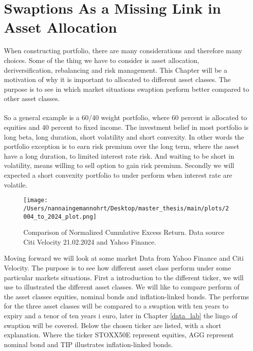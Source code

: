 \section{Swaptions As a Missing Link in Asset Allocation}
When constructing portfolio, there are many considerations and therefore many choices. 
Some of the thing we have to consider is asset allocation, deriversification, rebalancing 
and risk management. This Chapter will be a motivation of why it is important to 
allocated to different asset classes. The purpose is to see in which market situations
swaption perform better compared to other asset classes.
\\\\
So a general  example is a 60/40 weight portfolio, where 60 percent is allocated to equities 
and 40 percent to fixed income. 
The investment belief in most portfolio is long beta, long duration, short volatility and short 
convexity. In other words the portfolio exception is to earn risk premium over the long term, 
where the asset have a long duration, to limited interest rate risk. And waiting to be short in
volatility, means willing to sell option to gain risk premium. Secondly we will expected 
a short convexity portfolio to under perform when interest rate are volatile. 
\begin{figure}[H]
    \centering
    \texttt{[image: /Users/nannaingemannohrt/Desktop/master\_thesis/main/plots/2004\_to\_2024\_plot.png]}
    \caption{Comparison of Normalized Cumulative Excess Return. Data source Citi Velocity 21.02.2024 
    and Yahoo Finance.}
    \label{fig:2004_2024}
\end{figure}
\noindent
Moving forward we will look at some market Data from Yahoo Finance and Citi Velocity. 
The purpose is to see how different asset class perform under some particular markets situations.
First a introduction to the different ticker, we will use to illustrated the different asset classes. 
We will like to compare perform of the asset classes equities, nominal bonds and inflation-linked bonds. 
The performs for the three asset classes will be compared to a swaption with ten years to expiry and a tenor
of ten years i euro, later in Chapter \ref{data_lab} the lingo of swaption will be covered. 
Below the chosen ticker are listed, with a short explanation. Where the ticker STOXX50E represent equities, 
AGG represent nominal bond and TIP illustrates inflation-linked bonds.

